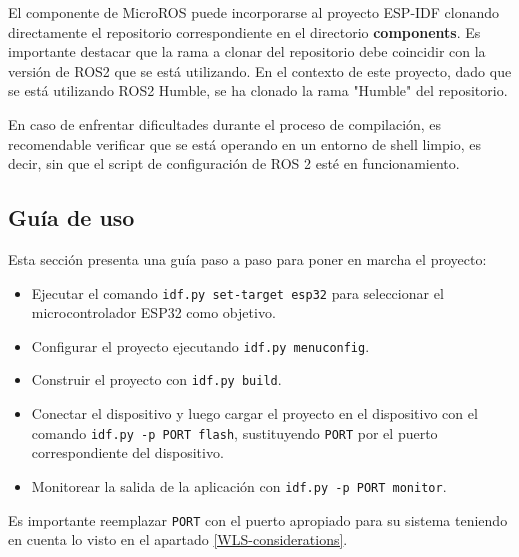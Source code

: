 El componente de MicroROS puede incorporarse al proyecto ESP-IDF clonando directamente el repositorio correspondiente en el directorio \textbf{components}. Es importante destacar que la rama a clonar del repositorio debe coincidir con la versión de ROS2 que se está utilizando. En el contexto de este proyecto, dado que se está utilizando ROS2 Humble, se ha clonado la rama "Humble" del repositorio.



En caso de enfrentar dificultades durante el proceso de compilación, es recomendable verificar que se está operando en un entorno de shell limpio, es decir, sin que el script de configuración de ROS 2 esté en funcionamiento.

\subsection{Guía de uso}
\label{subseccion:usageespidf}
Esta sección presenta una guía paso a paso para poner en marcha el proyecto:

\begin{itemize}
\item Ejecutar el comando \texttt{idf.py set-target esp32} para seleccionar el microcontrolador ESP32 como objetivo.
\item Configurar el proyecto ejecutando \texttt{idf.py menuconfig}.
\item Construir el proyecto con \texttt{idf.py build}.
\item Conectar el dispositivo y luego cargar el proyecto en el dispositivo con el comando \texttt{idf.py -p PORT flash}, sustituyendo \texttt{PORT} por el puerto correspondiente del dispositivo.
\item Monitorear la salida de la aplicación con \texttt{idf.py -p PORT monitor}.
\end{itemize}

Es importante reemplazar \texttt{PORT} con el puerto apropiado para su sistema teniendo en cuenta lo visto en el apartado \ref{WLS-considerations}.

